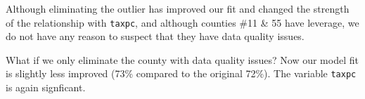 \documentclass[]{article}
\newenvironment{Shaded}{\begin{snugshade}}{\end{snugshade}}
\newcommand{\DataTypeTok}[1]{\textcolor[rgb]{0.13,0.29,0.53}{#1}}
\newcommand{\DecValTok}[1]{\textcolor[rgb]{0.00,0.00,0.81}{#1}}
\newcommand{\KeywordTok}[1]{\textcolor[rgb]{0.13,0.29,0.53}{\textbf{#1}}}
\newcommand{\NormalTok}[1]{#1}
\newcommand{\OperatorTok}[1]{\textcolor[rgb]{0.81,0.36,0.00}{\textbf{#1}}}
\newcommand{\StringTok}[1]{\textcolor[rgb]{0.31,0.60,0.02}{#1}}
\begin{document}
Although eliminating the outlier has improved our fit and changed the
strength of the relationship with \texttt{taxpc}, and although counties
\#11 \& 55 have leverage, we do not have any reason to suspect that they
have data quality issues.

What if we only eliminate the county with data quality issues? Now our
model fit is slightly less improved (73\% compared to the original
72\%). The variable \texttt{taxpc} is again signficant.

\begin{Shaded}
\end{Shaded}
\end{document}
